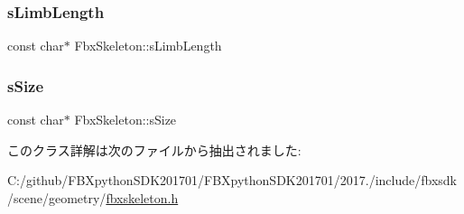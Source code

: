 \subsubsection{\texorpdfstring{s\+Limb\+Length}{sLimbLength}}
{\footnotesize\ttfamily const char$\ast$ Fbx\+Skeleton\+::s\+Limb\+Length\hspace{0.3cm}{\ttfamily [static]}}

\mbox{\label{class_fbx_skeleton_a311e444376931fb3c3b0ce1b7444eddb}} 
\subsubsection{\texorpdfstring{s\+Size}{sSize}}
{\footnotesize\ttfamily const char$\ast$ Fbx\+Skeleton\+::s\+Size\hspace{0.3cm}{\ttfamily [static]}}



このクラス詳解は次のファイルから抽出されました\+:\begin{DoxyCompactItemize}
\item 
C\+:/github/\+F\+B\+Xpython\+S\+D\+K201701/\+F\+B\+Xpython\+S\+D\+K201701/2017./include/fbxsdk/scene/geometry/\hyperlink{fbxskeleton_8h}{fbxskeleton.\+h}\end{DoxyCompactItemize}
